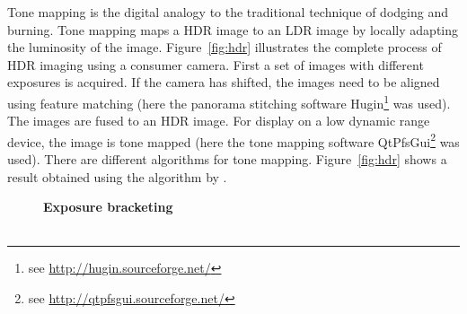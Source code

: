 \documentclass[12pt,a4paper,oneside,openright]{book}
\newcommand{\fig}[1]{Figure~\ref{fig:#1}}
\begin{document}
\begin{CJK}{UTF8}{}
Tone mapping is the digital analogy to the traditional technique of dodging and burning. Tone mapping maps a \ac{HDR} image to an \ac{LDR} image by locally adapting the luminosity of the image. \fig{hdr} illustrates the complete process of \ac{HDR} imaging using a consumer camera.
First a set of images with different exposures is acquired. If the camera has shifted, the images need to be aligned using feature matching (here the panorama stitching software Hugin\footnote{see \url{http://hugin.sourceforge.net/}} was used). The images are fused to an \ac{HDR} image. For display on a low dynamic range device, the image is tone mapped (here the tone mapping software QtPfsGui\footnote{see \url{http://qtpfsgui.sourceforge.net/}} was used). There are different algorithms for tone mapping. \fig{hdr} shows a result obtained using the algorithm by \citet{fattal2002gradient}.
\begin{figure}[htbp]
  \begin{center}
    \begin{minipage}[c]{.288\textwidth}
      \begin{center}
        \textbf{Exposure bracketing}\\
        \\

\end{center}
\end{minipage}
\end{center}
\end{figure}
\end{CJK}
\end{document}
